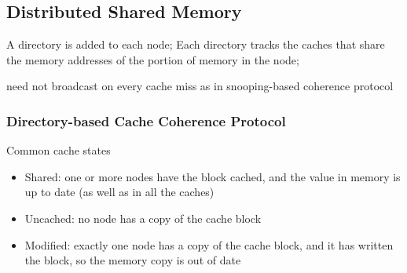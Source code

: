 \subsection{Distributed Shared Memory}
A directory is added to each node;
Each directory tracks the caches that share the
memory addresses of the portion of memory in
the node; 

need not broadcast on every cache miss as in
snooping-based coherence protocol

\subsubsection{Directory-based Cache Coherence Protocol}
Common cache states
\begin{itemize}
    \item Shared: 
    one or more nodes have the block cached,
    and the value in memory is up to date (as
    well as in all the caches)
    \item Uncached: 
    no node has a copy of the cache block
    \item Modified: 
    exactly one node has a copy of the cache
    block, and it has written the block, so the
    memory copy is out of date
\end{itemize}

